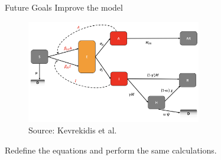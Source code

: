 \begin{slide}{Future Goals}
	{\large Improve the model}
	
	\vspace{.5cm}
	
	\begin{figure}
		\centering
		\includegraphics[height=4.5cm]{images/advanced-schematic} \\
		{\small Source: Kevrekidis et al.}
	\end{figure}
	
	Redefine the equations and perform the same calculations.
\end{slide}